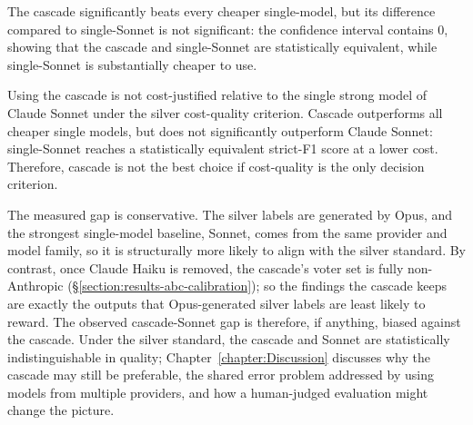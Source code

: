 \begin{itemize}[label={},leftmargin=1.5em]
    The cascade significantly beats every cheaper single-model, but its difference compared to single-Sonnet is not significant: the confidence interval contains 0, showing that the cascade and single-Sonnet are statistically equivalent, while single-Sonnet is substantially cheaper to use.

\end{itemize}

Using the cascade is not cost-justified relative to the single strong model of Claude Sonnet under the silver cost-quality criterion. Cascade outperforms all cheaper single models, but does not significantly outperform Claude Sonnet: single-Sonnet reaches a statistically equivalent strict-F1 score at a lower cost. Therefore, cascade is not the best choice if cost-quality is the only decision criterion. 

The measured gap is conservative. The silver labels are generated by Opus, and the strongest single-model baseline, Sonnet, comes from the same provider and model family, so it is structurally more likely to align with the silver standard. By contrast, once Claude Haiku is removed, the cascade's voter set is fully non-Anthropic (§\ref{section:results-abc-calibration}); so the findings the cascade keeps are exactly the outputs that Opus-generated silver labels are least likely to reward. The observed cascade-Sonnet gap is therefore, if anything, biased against the cascade. Under the silver standard, the cascade and Sonnet are statistically indistinguishable in quality; Chapter~\ref{chapter:Discussion} discusses why the cascade may still be preferable, the shared error problem addressed by using models from multiple providers, and how a human-judged evaluation might change the picture.